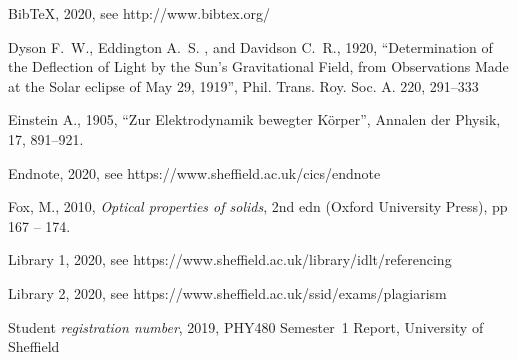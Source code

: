\documentclass[a4paper,fleqn,usenatbib]{mnras}
\begin{document}






%

%



\begin{thebibliography}{99}


BibTeX, 2020, see http://www.bibtex.org/ 

Dyson F.~W., Eddington A.~S. , and Davidson C.~R., 1920, ``Determination of the Deflection of Light by the Sun's Gravitational Field, from Observations Made at the Solar eclipse of May 29, 1919'', Phil. Trans. Roy. Soc. A. 220, 291--333 

Einstein A., 1905, ``Zur Elektrodynamik bewegter K\"{o}rper'', Annalen der Physik, 17, 891--921.

Endnote, 2020, see https://www.sheffield.ac.uk/cics/endnote

Fox, M., 2010, \textit{Optical properties of solids}, 2nd edn (Oxford University Press), pp 167 -- 174.

Library 1, 2020, see https://www.sheffield.ac.uk/library/idlt/referencing

Library 2, 2020, see https://www.sheffield.ac.uk/ssid/exams/plagiarism

Student \textit{registration number}, 2019, PHY480 Semester~1 Report, University of Sheffield

\end{thebibliography}


\appendix
\end{document}
